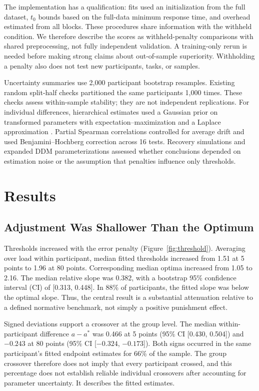 \documentclass[10pt,letterpaper]{article}
\begin{document}
The implementation has a qualification: fits used an initialization from the full dataset, $t_0$ bounds based on the full-data minimum response time, and overhead estimated from all blocks. These procedures share information with the withheld condition. We therefore describe the scores as withheld-penalty comparisons with shared preprocessing, not fully independent validation. A training-only rerun is needed before making strong claims about out-of-sample superiority. Withholding a penalty also does not test new participants, tasks, or samples.

Uncertainty summaries use 2,000 participant bootstrap resamples. Existing random split-half checks partitioned the same participants 1,000 times. These checks assess within-sample stability; they are not independent replications. For individual differences, hierarchical estimates used a Gaussian prior on transformed parameters with expectation--maximization and a Laplace approximation \citep{huys2011}. Partial Spearman correlations controlled for average drift and used Benjamini--Hochberg correction across 16 tests. Recovery simulations and expanded DDM parameterizations assessed whether conclusions depended on estimation noise or the assumption that penalties influence only thresholds.

\section{Results}
\subsection{Adjustment Was Shallower Than the Optimum}
Thresholds increased with the error penalty (Figure~\ref{fig:threshold}). Averaging over load within participant, median fitted thresholds increased from 1.51 at 5 points to 1.96 at 80 points. Corresponding median optima increased from 1.05 to 2.16. The median relative slope was 0.382, with a bootstrap 95\% confidence interval (CI) of [0.313, 0.448]. In 88\% of participants, the fitted slope was below the optimal slope. Thus, the central result is a substantial attenuation relative to a defined normative benchmark, not simply a positive punishment effect.

Signed deviations support a crossover at the group level. The median within-participant difference $a-a^*$ was 0.466 at 5 points (95\% CI [0.430, 0.504]) and $-0.243$ at 80 points (95\% CI [$-0.324$, $-0.173$]). Both signs occurred in the same participant's fitted endpoint estimates for 66\% of the sample. The group crossover therefore does not imply that every participant crossed, and this percentage does not establish reliable individual crossovers after accounting for parameter uncertainty. It describes the fitted estimates.
\end{document}
